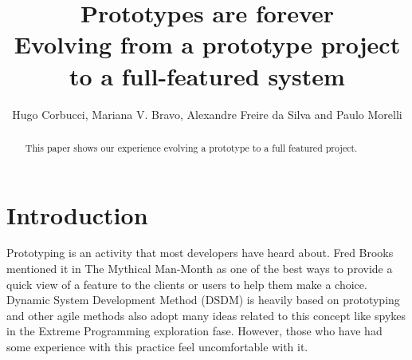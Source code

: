 \documentclass[lnbip]{svmultln}
\begin{document}
%
\mainmatter              %
%
\title{Prototypes are forever\\
  Evolving from a prototype project\\ to a full-featured system}
%
%
\author{Hugo Corbucci, Mariana V. Bravo, Alexandre Freire da Silva and Paulo Morelli}
%
%
%

\maketitle              %

\begin{abstract}        %

This paper shows our experience evolving a prototype to a full featured project.

\end{abstract}
%
\section{Introduction}

Prototyping is an activity that most developers have heard about. Fred
Brooks mentioned it in The Mythical Man-Month \cite{Brooks1975} as one
of the best ways to provide a quick view of a feature to the clients
or users to help them make a choice. Dynamic System Development Method
(DSDM)\cite{DSDM} is heavily based on prototyping and other agile
methods also adopt many ideas related to this concept like spykes\cite{XP} in the Extreme Programming exploration fase. 
However, those who have had some experience with this practice feel uncomfortable with it\cite{quem disse? esse tipo de afirmação é sempre bom ter uma citação, já apanhei bastante sobre isso. ale}.
\end{document}
